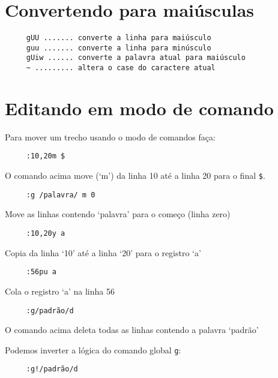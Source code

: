 \section{Convertendo para maiúsculas}
\label{sec:Convertendo para maiúsculas}

\begin{verbatim}
     gUU ....... converte a linha para maiúsculo
     guu ....... converte a linha para minúsculo
     gUiw ...... converte a palavra atual para maiúsculo
     ~ ......... altera o case do caractere atual
\end{verbatim}


\section{Editando em modo de comando}\label{sec:Editando em modo de comando}

Para mover um trecho usando o modo de comandos faça:

\begin{verbatim}
     :10,20m $
\end{verbatim}

O comando acima move (`m') da linha 10 até a linha 20 para o final \verb|$|.

\begin{verbatim}
     :g /palavra/ m 0
\end{verbatim}

Move as linhas contendo `palavra' para o começo (linha zero)


\begin{verbatim}
     :10,20y a
\end{verbatim}

Copia da linha `10' até a linha `20' para o registro `a'

\begin{verbatim}
     :56pu a
\end{verbatim}

Cola o registro `a' na linha 56

\begin{verbatim}
     :g/padrão/d
\end{verbatim}

O comando acima deleta todas as linhas contendo a palavra `padrão'

Podemos inverter a lógica do comando global \verb+g+:

\begin{verbatim}
     :g!/padrão/d
\end{verbatim}

